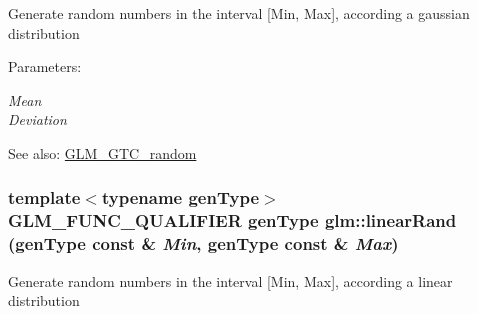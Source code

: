 Generate random numbers in the interval \mbox{[}Min, Max\mbox{]}, according a gaussian distribution

\begin{Desc}
\item[Parameters:]
\begin{description}
\item[{\em Mean}]\item[{\em Deviation}]\end{description}
\end{Desc}
\begin{Desc}
\item[See also:]\hyperlink{group__gtc__random}{GLM\_\-GTC\_\-random} \end{Desc}
\hypertarget{group__gtc__random_gb955b990407d8d4b62cfe2a2a89d9492}{
\subsubsection[linearRand]{\setlength{\rightskip}{0pt plus 5cm}template$<$typename genType$>$ GLM\_\-FUNC\_\-QUALIFIER genType glm::linearRand (genType const \& {\em Min}, \/  genType const \& {\em Max})}}
\label{group__gtc__random_gb955b990407d8d4b62cfe2a2a89d9492}


Generate random numbers in the interval \mbox{[}Min, Max\mbox{]}, according a linear distribution

